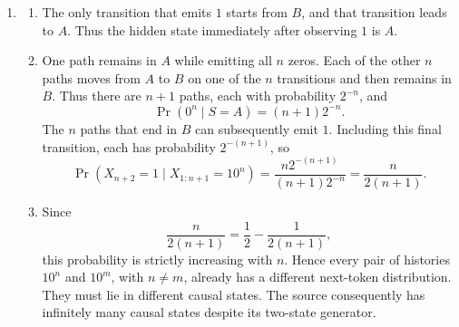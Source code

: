 \documentclass[11pt]{article}
\begin{document}
\begin{solution}[ex:p2-3]
\begin{enumerate}
\begin{enumerate}
            These four states are distinct. The state represented by $01$
            cannot emit $0$, whereas the other three can. The continuation
            $10$ is impossible after $0$ but possible after $\emptyset$ and
            $1$. Finally, $\epsilon(\emptyset)\neq\epsilon(1)$ by assumption.
            Hence the displayed representatives are also shortest.

          \item Appending each possible symbol gives the causal-state update:
            \[
              \begin{array}{c|cc}
                \text{state} & 0 & 1\\
                \hline
                \epsilon(\emptyset) & \epsilon(0) & \epsilon(1)\\
                \epsilon(1)         & \epsilon(0) & \epsilon(\emptyset)\\
                \epsilon(0)         & \epsilon(0) & \epsilon(01)\\
                \epsilon(01)        & \text{--}   & \epsilon(0)
              \end{array}
            \]
            Here a dash denotes an impossible extension. Drawing one node for
            each row and the indicated symbol-labelled edges gives the
            required automaton.
        \end{enumerate}

      \item
        \begin{enumerate}
          \item The only transition that emits $1$ starts from $B$, and that
            transition leads to $A$. Thus the hidden state immediately after
            observing $1$ is $A$.

          \item One path remains in $A$ while emitting all $n$ zeros. Each of
            the other $n$ paths moves from $A$ to $B$ on one of the $n$
            transitions and then remains in $B$. Thus there are $n+1$ paths,
            each with probability $2^{-n}$, and
            \[
              \Pr(0^n\mid S=A)=(n+1)2^{-n}.
            \]
            The $n$ paths that end in $B$ can subsequently emit $1$. Including
            this final transition, each has probability $2^{-(n+1)}$, so
            \[
              \Pr(X_{n+2}=1\mid X_{1:n+1}=10^n)
                =\frac{n2^{-(n+1)}}{(n+1)2^{-n}}
                =\frac{n}{2(n+1)}.
            \]

          \item Since
            \[
              \frac{n}{2(n+1)}=\frac12-\frac{1}{2(n+1)},
            \]
            this probability is strictly increasing with $n$. Hence every pair
            of histories $10^n$ and $10^m$, with $n\neq m$, already has a
            different next-token distribution. They must lie in different
            causal states. The source consequently has infinitely many causal
            states despite its two-state generator.
        \end{enumerate}
    \end{enumerate}
\end{solution}
\end{document}

